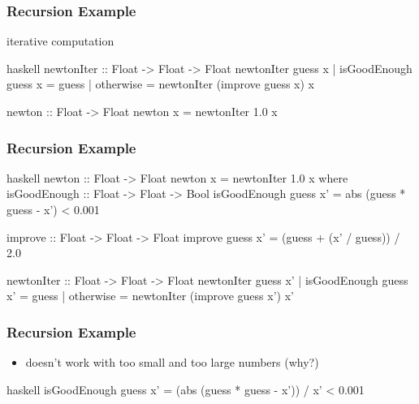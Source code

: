 \documentclass[dvipsnames]{beamer}
\theoremstyle{plain}
\begin{document}
\begin{frame}[fragile]
  \frametitle{Recursion Example}

  \begin{exampleblock}{iterative computation}
    \begin{pygments}{haskell}
newtonIter :: Float -> Float -> Float
newtonIter guess x
  | isGoodEnough guess x = guess
  | otherwise            =
        newtonIter (improve guess x) x

newton :: Float -> Float
newton x = newtonIter 1.0 x
    \end{pygments}
  \end{exampleblock}
\end{frame}

\begin{frame}[fragile]
  \frametitle{Recursion Example}

  \begin{exampleblock}{}
    \begin{pygments}{haskell}
newton :: Float -> Float
newton x = newtonIter 1.0 x
  where
    isGoodEnough :: Float -> Float -> Bool
    isGoodEnough guess x' =
        abs (guess * guess - x') < 0.001

    improve :: Float -> Float -> Float
    improve guess x' = (guess + (x' / guess)) / 2.0

    newtonIter :: Float -> Float -> Float
    newtonIter guess x'
      | isGoodEnough guess x' = guess
      | otherwise             =
          newtonIter (improve guess x') x'
    \end{pygments}
  \end{exampleblock}
\end{frame}

\begin{frame}[fragile]
  \frametitle{Recursion Example}

  \begin{exampleblock}{}
    \begin{itemize}
      \item doesn't work with too small and too large numbers (why?)
    \end{itemize}

    \pause
    \smallskip
    \begin{pygments}{haskell}
isGoodEnough guess x' =
    (abs (guess * guess - x')) / x' < 0.001
    \end{pygments}
  \end{exampleblock}
\end{frame}
\end{document}
